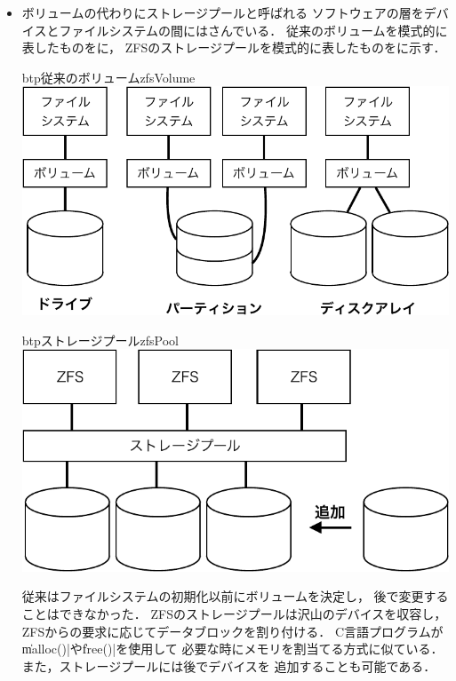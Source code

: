 \begin{itemize}
\item ボリュームの代わりにストレージプールと呼ばれる
  ソフトウェアの層をデバイスとファイルシステムの間にはさんでいる．
  従来のボリュームを模式的に表したものをに，
  ZFSのストレージプールを模式的に表したものをに示す．

  \begin{myfig}{btp}{従来のボリューム}{zfsVolume}
    \centering\includegraphics[scale=0.65]{Fig/zfsVolume-crop.pdf}
  \end{myfig}

  \begin{myfig}{btp}{ストレージプール}{zfsPool}
    \centering\includegraphics[scale=0.65]{Fig/zfsPool-crop.pdf}
  \end{myfig}
  
  従来はファイルシステムの初期化以前にボリュームを決定し，
  後で変更することはできなかった．
  ZFSのストレージプールは沢山のデバイスを収容し，
  ZFSからの要求に応じてデータブロックを割り付ける．
  C言語プログラムが\|malloc()|や\|free()|を使用して
  必要な時にメモリを割当てる方式に似ている．
  また，ストレージプールには後でデバイスを
  追加することも可能である．


\end{itemize}
